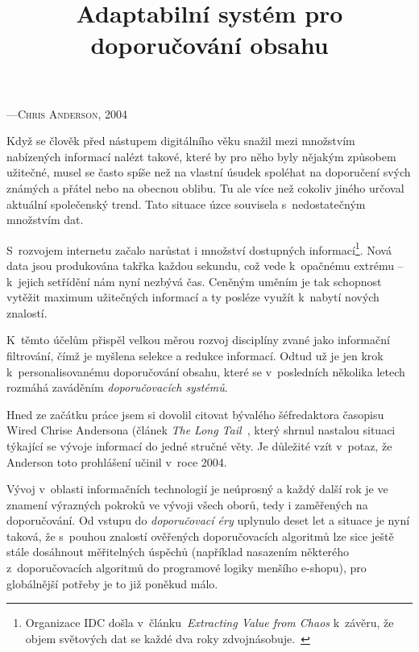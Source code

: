 \documentclass[thesis=M,czech]{FITthesis}[2014/05/07]
\title{Adaptabilní systém pro doporučování obsahu}
\begin{document}

\begin{introduction}
\begin{epigraphs}
%
 {---\textsc{Chris Anderson, 2004~\cite{anderson}}}
 \end{epigraphs}	
	Když se člověk před nástupem digitálního věku snažil mezi množstvím nabízených informací nalézt takové, které by pro něho byly nějakým způsobem užitečné, musel se často spíše než na vlastní úsudek spoléhat na doporučení svých známých a přátel nebo na obecnou oblibu. Tu ale více než cokoliv jiného určoval aktuální společenský trend. Tato situace úzce souvisela s~nedostatečným množstvím dat.

	S~rozvojem internetu začalo narůstat i množství dostupných informací\footnote{Organizace IDC došla v~článku~\emph{Extracting Value from Chaos} k~závěru, že objem světových dat se každé dva roky zdvojnásobuje.~\cite{digitaluniverse}}. Nová data jsou produkována takřka každou sekundu, což vede k~opačnému extrému – k~jejich setřídění nám nyní nezbývá čas. Ceněným uměním je tak schopnost vytěžit maximum užitečných informací a ty posléze využít k~nabytí nových znalostí.
	
	K~těmto účelům přispěl velkou měrou rozvoj disciplíny zvané jako informační filtrování, čímž je myšlena selekce a redukce informací. Odtud už je jen krok k~personalisovanému doporučování obsahu, které se v~posledních několika letech rozmáhá zaváděním \emph{doporučovacích systémů}. 

	Hned ze začátku práce jsem si dovolil citovat bývalého šéfredaktora časopisu Wired Chrise Andersona (článek \emph{The Long Tail~\cite{anderson}}, který shrnul nastalou situaci týkající se vývoje informací do jedné stručné věty. Je důležité vzít v~potaz, že Anderson toto prohlášení učinil v~roce 2004. 
	
	Vývoj v~oblasti informačních technologií je neúprosný a každý další rok je ve znamení výrazných pokroků ve vývoji všech oborů, tedy i zaměřených na doporučování. Od vstupu do \emph{doporučovací éry} uplynulo deset let a situace je nyní taková, že s~pouhou znalostí ověřených doporučovacích algoritmů lze sice ještě stále dosáhnout měřitelných úspěchů (například nasazením některého z~doporučovacích algoritmů do programové logiky menšího e-shopu), pro globálnější potřeby je to již poněkud málo.
	

\end{introduction}
\end{document}
